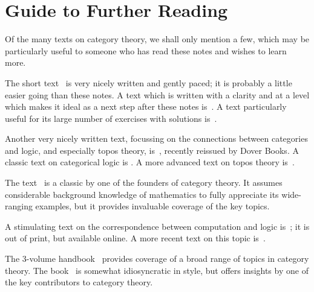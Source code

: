 \documentclass[12pt]{article}
\begin{document}
\section{Guide to Further Reading}
Of the many texts on category theory, we shall only mention a few, which may be particularly useful to someone who has read these notes and wishes to learn more.

The short text~\cite{Pie} is very nicely written and gently paced; it is probably a little easier going than these notes.
A text which is written with a clarity and at a level which makes it ideal as a next step after these notes is~\cite{HS}. A text particularly useful for its large number of exercises with solutions is~\cite{BW}.

Another very nicely written text, focussing on the connections between categories and logic, and especially topos theory, is~\cite{Gol}, recently reissued by Dover Books. A classic text on categorical logic is \cite{LS}. A more advanced text on topos theory is~\cite{MacM}.

The text~\cite{Mac} is a classic by one of the founders of category theory. It assumes considerable background knowledge of mathematics to fully appreciate its wide-ranging examples, but it provides invaluable coverage of the key topics.

A stimulating text on the correspondence between computation and logic is~\cite{PT}; it  is out of print, but available online. A more recent  text on this topic is~\cite{CH}.

The 3-volume handbook~\cite{Bor} provides coverage of a broad range of topics in category theory.
The book~\cite{LS2} is somewhat idiosyncratic in style, but offers insights by one of the key contributors to category theory.
\end{document}
